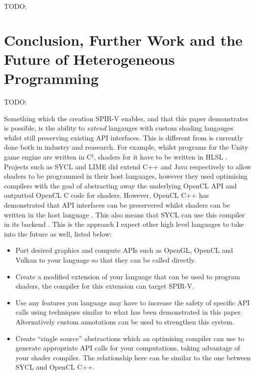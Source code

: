 \documentclass[a4paper,12pt,twoside,openright]{report}
\begin{document}
TODO:


\chapter{Conclusion, Further Work and the Future of Heterogeneous Programming}



TODO:

Something which the creation SPIR-V enables, and that this paper demonstrates
is possible, is the ability to \textit{extend} langauges with custom shading
langauges whilst still preserving existing API interfaces. This is different
from is currently done both in industry and reasearch. For example, whilst
programs for the Unity game engine are written in C$^\sharp$, shaders for it
have to be written in HLSL \cite{TODO}. Projects such as SYCL and LIME did
extend C++ and Java respectively to allow shaders to be programmed in their
host languages, however they used optimising compilers with the goal of
abstracting away the underlying OpenCL API and outputted OpenCL C code for
shaders. However, OpenCL C++ has demonstrated that API interfaces can be
preservered whilst shaders can be written in the host language
\cite{OpenCLCPPWhitePaper}. This also means that SYCL can use this compiler in
its backend \cite{TODO}. This is the approach I expect other high level
languages to take into the future as well, listed below:

\begin{itemize}

    \item Port desired graphics and compute APIs such as OpenGL, OpenCL and
    Vulkan to your language so that they can be called directly.

    \item Create a modified extension of your language that can be used to
    program shaders, the compiler for this extension can target SPIR-V.

    \item Use any features you language may have to increase the safety of
    specific API calls using techniques similar to what has been demonstrated
    in this paper. Alternatively custom annotations can be used to strengthen
    this system.

    \item Create ``single source'' abstractions which an optimising compiler
    can use to generate appropriate API calls for your computations, taking
    advantage of your shader compiler. The relationship here can be similar to
    the one between SYCL and OpenCL C++.

\end{itemize}
\end{document}
